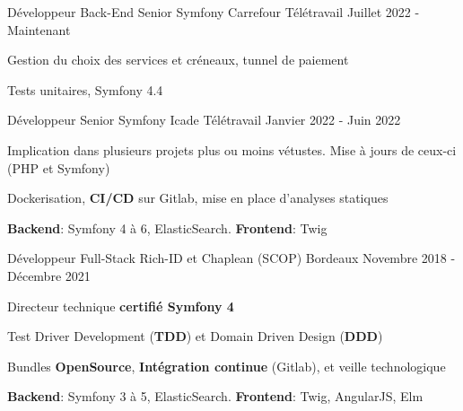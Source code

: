 

\begin{cventries}

  \cventry
    {Développeur Back-End Senior Symfony} %
    {Carrefour} %
    {Télétravail} %
    {Juillet 2022 - Maintenant} %
    {
      \begin{cvitems} %
        \item {Gestion du choix des services et créneaux, tunnel de paiement}
        \item {Tests unitaires, Symfony 4.4}
      \end{cvitems}
    }

  \cventry
    {Développeur Senior Symfony} %
    {Icade} %
    {Télétravail} %
    {Janvier 2022 - Juin 2022} %
    {
      \begin{cvitems} %
        \item {Implication dans plusieurs projets plus ou moins vétustes. Mise à jours de ceux-ci (PHP et Symfony)}
        \item {Dockerisation, \textbf{CI/CD} sur Gitlab, mise en place d'analyses statiques}
        \item {\textbf{Backend}: Symfony 4 à 6, ElasticSearch. \textbf{Frontend}: Twig}
      \end{cvitems}
    }

  \cventry
    {Développeur Full-Stack} %
    {Rich-ID et Chaplean (SCOP)} %
    {Bordeaux} %
    {Novembre 2018 - Décembre 2021} %
    {
      \begin{cvitems} %
        \item {Directeur technique \textbf{certifié Symfony 4}}
        \item {Test Driver Development (\textbf{TDD}) et Domain Driven Design (\textbf{DDD})}
        \item {Bundles \textbf{OpenSource}, \textbf{Intégration continue} (Gitlab), et veille technologique}
        \item {\textbf{Backend}: Symfony 3 à 5, ElasticSearch. \textbf{Frontend}: Twig, AngularJS, Elm}
      \end{cvitems}
    }

\end{cventries}
